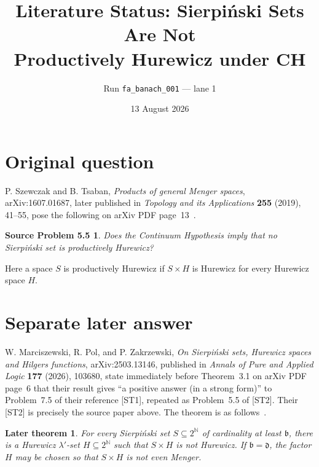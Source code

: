 \documentclass[11pt]{article}
\title{Literature Status: Sierpi\'nski Sets Are Not\\
Productively Hurewicz under CH}
\author{Run \texttt{fa\_banach\_001} --- lane 1}
\date{13 August 2026}
\newtheorem*{question}{Source Problem 5.5}
\newtheorem*{answer}{Later theorem}
\begin{document}
\maketitle

\begin{center}
\end{center}

\section{Original question}

P. Szewczak and B. Tsaban,
\emph{Products of general Menger spaces}, arXiv:1607.01687, later
published in \emph{Topology and its Applications} \textbf{255} (2019),
41--55, pose the following on arXiv PDF page~13~\cite{source}.

\begin{question}
Does the Continuum Hypothesis imply that no Sierpi\'nski set is
productively Hurewicz?
\end{question}

Here a space $S$ is productively Hurewicz if $S\times H$ is Hurewicz
for every Hurewicz space $H$.

\section{Separate later answer}

W. Marciszewski, R. Pol, and P. Zakrzewski,
\emph{On Sierpi\'nski sets, Hurewicz spaces and Hilgers functions},
arXiv:2503.13146, published in \emph{Annals of Pure and Applied Logic}
\textbf{177} (2026), 103680, state immediately before Theorem~3.1 on
arXiv PDF page~6 that their result gives ``a positive answer (in a strong
form)'' to Problem~7.5 of their reference [ST1], repeated as Problem~5.5
of [ST2].  Their [ST2] is precisely the source paper above.  The theorem
is as follows~\cite{answerpaper}.

\begin{answer}
For every Sierpi\'nski set $S\subseteq 2^{\mathbb N}$ of cardinality at
least $\mathfrak b$, there is a Hurewicz $\lambda'$-set
$H\subseteq 2^{\mathbb N}$ such that $S\times H$ is not Hurewicz.  If
$\mathfrak b=\mathfrak d$, the factor $H$ may be chosen so that
$S\times H$ is not even Menger.
\end{answer}
\end{document}
